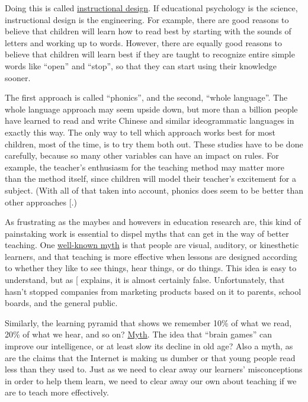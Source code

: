 Doing this is called \protect\hyperlink{g:instructional-design}{instructional design}.
If educational psychology is the science, instructional design is the
engineering. For example, there are good reasons to believe that
children will learn how to read best by starting with the sounds of
letters and working up to words. However, there are equally good
reasons to believe that children will learn best if they are taught to
recognize entire simple words like ``open'' and ``stop'', so that they can
start using their knowledge sooner.

The first approach is called ``phonics'', and the second, ``whole
language''. The whole language approach may seem upside down, but more
than a billion people have learned to read and write Chinese and similar
ideogrammatic languages in exactly this way. The only way to tell which
approach works best for most children, most of the time, is to try them
both out. These studies have to be done carefully, because so many other
variables can have an impact on rules. For example, the teacher's
enthusiasm for the teaching method may matter more than the method
itself, since children will model their teacher's excitement for a
subject. (With all of that taken into account, phonics does seem to be
better than other approaches {[}\protect[\hyperlink{b:Foor1998}{Foor1998}]{]}.)

As frustrating as the maybes and howevers in education research are,
this kind of painstaking work is essential to dispel myths that can
get in the way of better teaching. One \href{https://en.wikipedia.org/wiki/Learning_styles\#Learning_modalities}{well-known
myth} is that people are visual, auditory, or
kinesthetic learners, and that teaching is more effective when lessons
are designed according to whether they like to see things, hear
things, or do things. This idea is easy to understand, but as
{[}\protect[\hyperlink{b:DeBr2015}{DeBr2015}]{]} explains, it is almost certainly
false. Unfortunately, that hasn't stopped companies from marketing
products based on it to parents, school boards, and the general
public.

Similarly, the learning pyramid that shows we remember 10\% of what we
read, 20\% of what we hear, and so on? \href{https://www.worklearning.com/2015/01/05/mythical-retention-data-the-corrupted-cone/}{Myth}. The
idea that ``brain games'' can improve our intelligence, or at least slow
its decline in old age? Also a myth, as are the claims that the
Internet is making us dumber or that young people read less than they
used to. Just as we need to clear away our learners' misconceptions in
order to help them learn, we need to clear away our own about teaching
if we are to teach more effectively.

